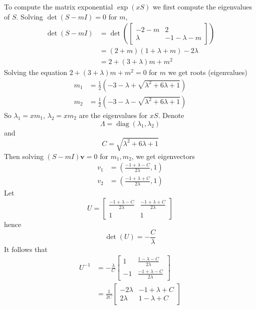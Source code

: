 \documentclass{article}
\theoremstyle{plain}
\theoremstyle{definition}
\theoremstyle{remark}
\numberwithin{equation}{section}
\begin{document}
To compute the matrix exponential $\exp(x S)$ we first compute the eigenvalues of $S$.
Solving $\det(S - m I) = 0$ for $m$,
\begin{align*}
    \det(S - m I) &= \det\left(\begin{bmatrix}
        -2 - m & 2\\
        \lambda & - 1 - \lambda - m
    \end{bmatrix} \right)\\
    &= (2 + m) (1 + \lambda + m) - 2 \lambda\\
    &= 2 + (3 + \lambda) m + m^2
\end{align*}
Solving the equation $2 + (3 + \lambda) m + m^2 = 0$ for $m$ we get roots (eigenvalues)
\begin{align*}
    m_1 &= \frac{1}{2}(-3 - \lambda + \sqrt{\lambda^2 + 6 \lambda + 1})\\
    m_2 &= \frac{1}{2}(-3 - \lambda - \sqrt{\lambda^2 + 6 \lambda + 1})
\end{align*}
So $\lambda_1 = x m_1$, $\lambda_2 = x m_2$ are the eigenvalues for $x S$.
Denote
$$
\Lambda = \operatorname{diag}(\lambda_1, \lambda_2)
$$
and
$$
C = \sqrt{\lambda^2 + 6 \lambda + 1}
$$
Then solving $(S - m I) \mathbf{v} = 0$ for $m_1, m_2$, we get eigenvectors
\begin{align*}
    v_1 &= \left( \frac{-1 + \lambda - C}{2\lambda}, 1 \right)\\
    v_2 &= \left( \frac{-1 + \lambda + C}{2\lambda}, 1 \right)
\end{align*}
Let
$$
U = \begin{bmatrix}
    \frac{-1 + \lambda - C}{2\lambda} & \frac{-1 + \lambda + C}{2\lambda}\\
    1 & 1
\end{bmatrix}
$$
hence
$$
\det(U) = - \frac{C}{\lambda}
$$
It follows that
\begin{align*}
    U^{-1} &= - \frac{\lambda}{C} \begin{bmatrix}
    1 & \frac{1 - \lambda - C}{2\lambda}\\
    -1 & \frac{-1 + \lambda - C}{2\lambda}
    \end{bmatrix}\\
    &= \frac{1}{2C} \begin{bmatrix}
    -2\lambda & -1 + \lambda + C\\
    2\lambda & 1 - \lambda + C
    \end{bmatrix}
\end{align*}
\end{document}
